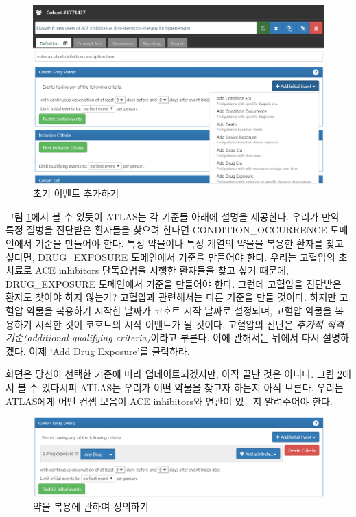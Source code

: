 \documentclass[11pt]{book}
\theoremstyle{definition}
\theoremstyle{definition}
\theoremstyle{definition}
\theoremstyle{remark}
\begin{document}
\begin{figure}

{\centering \includegraphics[width=1\linewidth]{images/Cohorts/ATLAS-initialevent} 

}

\caption{초기 이벤트 추가하기}\label{fig:ATLASinitialevent}
\end{figure}

그림 \ref{fig:ATLASinitialevent}에서 볼 수 있듯이 ATLAS는 각 기준들
아래에 설명을 제공한다. 우리가 만약 특정 질병을 진단받은 환자들을 찾으려
한다면 CONDITION\_OCCURRENCE 도메인에서 기준을 만들어야 한다. 특정
약물이나 특정 계열의 약물을 복용한 환자를 찾고 싶다면, DRUG\_EXPOSURE
도메인에서 기준을 만들어야 한다. 우리는 고혈압의 초치료로 ACE inhibitors
단독요법을 시행한 환자들을 찾고 싶기 때문에, DRUG\_EXPOSURE 도메인에서
기준을 만들어야 한다. 그런데 고혈압을 진단받은 환자도 찾아야 하지
않는가? 고혈압과 관련해서는 다른 기준을 만들 것이다. 하지만 고혈압
약물을 복용하기 시작한 날짜가 코호트 시작 날짜로 설정되며, 고혈압 약물을
복용하기 시작한 것이 코호트의 시작 이벤트가 될 것이다. 고혈압의 진단은
\emph{추가적 적격 기준(additional qualifying criteria)}이라고 부른다.
이에 관해서는 뒤에서 다시 설명하겠다. 이제 `Add Drug Exposure'를
클릭하라.

화면은 당신이 선택한 기준에 따라 업데이트되겠지만, 아직 끝난 것은
아니다. 그림 \ref{fig:ATLASdrugexposure}에서 볼 수 있다시피 ATLAS는
우리가 어떤 약물을 찾고자 하는지 아직 모른다. 우리는 ATLAS에게 어떤 컨셉
모음이 ACE inhibitors와 연관이 있는지 알려주어야 한다.

\begin{figure}

{\centering \includegraphics[width=1\linewidth]{images/Cohorts/ATLAS-drugexposure} 

}

\caption{약물 복용에 관하여 정의하기}\label{fig:ATLASdrugexposure}
\end{figure}
\end{document}

